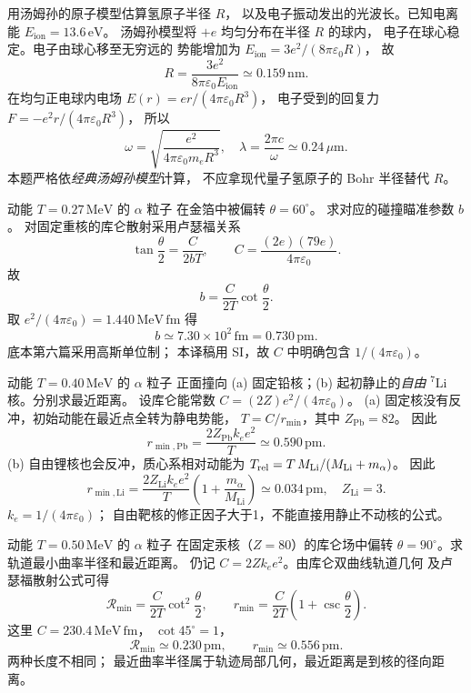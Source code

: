 用汤姆孙的原子模型估算氢原子半径 $R$，
以及电子振动发出的光波长。已知电离能
$E_{\mathrm{ion}}=13.6\,\mathrm{eV}$。
\exsolution
汤姆孙模型将 $+e$ 均匀分布在半径 $R$ 的球内，
电子在球心稳定。电子由球心移至无穷远的
势能增加为
$E_{\mathrm{ion}}=3e^2/(8\pi\varepsilon_0R)$，
故
\[
 \boxed{R=\frac{3e^2}{8\pi\varepsilon_0E_{\mathrm{ion}}}
 \simeq0.159\,\mathrm{nm}}.
\]
在均匀正电球内电场 $E(r)=er/(4\pi\varepsilon_0R^3)$，
电子受到的回复力 $F=-e^2r/(4\pi\varepsilon_0R^3)$，
所以
\[
 \omega=\sqrt{\frac{e^2}{4\pi\varepsilon_0m_eR^3}},
 \quad\boxed{\lambda=\frac{2\pi c}{\omega}
 \simeq0.24\,\mu\mathrm m}.
\]
\excheck 本题严格依\emph{经典汤姆孙模型}计算，
不应拿现代量子氢原子的 Bohr 半径替代 $R$。

动能 $T=0.27\,\mathrm{MeV}$ 的 $\alpha$ 粒子
在金箔中被偏转 $\theta=60^\circ$。
求对应的碰撞瞄准参数 $b$。
\exsolution
对固定重核的库仑散射采用卢瑟福关系
\[
 \tan\frac\theta2=
 \frac{C}{2bT},\qquad
 C=\frac{(2e)(79e)}{4\pi\varepsilon_0}.
\]
故
\[
 \boxed{b=\frac C{2T}\cot\frac\theta2}.
\]
取 $e^2/(4\pi\varepsilon_0)
=1.440\,\mathrm{MeV\,fm}$ 得
\[
 \boxed{b\simeq7.30\times10^2\,\mathrm{fm}
 =0.730\,\mathrm{pm}}.
\]
\excheck 底本第六篇采用高斯单位制；
本译稿用 SI，故 $C$ 中明确包含 $1/(4\pi\varepsilon_0)$。

动能 $T=0.40\,\mathrm{MeV}$ 的 $\alpha$ 粒子
正面撞向 (a) 固定铅核；(b) 起初静止的\emph{自由}
$^{7}\mathrm{Li}$ 核。分别求最近距离。
\exsolution
设库仑能常数
$C=(2Z)e^2/(4\pi\varepsilon_0)$。
(a) 固定核没有反冲，初始动能在最近点全转为静电势能，
$T=C/r_{\min}$，其中 $Z_{\mathrm{Pb}}=82$。
因此
\[
 \boxed{r_{\min,\mathrm{Pb}}=\frac{2Z_{\mathrm{Pb}}k_e e^2}{T}
 \simeq0.590\,\mathrm{pm}}.
\]
(b) 自由锂核也会反冲，质心系相对动能为
$T_{\rm rel}=T\,M_{\rm Li}/(M_{\rm Li}+m_\alpha)$。
因此
\[
 \boxed{r_{\min,\mathrm{Li}}=
 \frac{2Z_{\mathrm{Li}}k_e e^2}{T}
 \left(1+\frac{m_\alpha}{M_{\mathrm{Li}}}\right)
 \simeq0.034\,\mathrm{pm}},
 \quad Z_{\mathrm{Li}}=3.
\]
\excheck $k_e=1/(4\pi\varepsilon_0)$；
自由靶核的修正因子大于1，不能直接用静止不动核的公式。

动能 $T=0.50\,\mathrm{MeV}$ 的 $\alpha$ 粒子
在固定汞核（$Z=80$）的库仑场中偏转
$\theta=90^\circ$。求轨道最小曲率半径和最近距离。
\exsolution
仍记 $C=2Zk_e e^2$。由库仑双曲线轨道几何
及卢瑟福散射公式可得
\[
 \boxed{\mathcal R_{\min}=
 \frac C{2T}\cot^2\frac\theta2},\qquad
 \boxed{r_{\min}=
 \frac C{2T}\left(1+\csc\frac\theta2\right)}.
\]
这里 $C=230.4\,\mathrm{MeV\,fm}$，
$\cot45^\circ=1$，
\[
 \boxed{\mathcal R_{\min}\simeq0.230\,\mathrm{pm}},
 \qquad\boxed{r_{\min}\simeq0.556\,\mathrm{pm}}.
\]
\excheck 两种长度不相同；
最近曲率半径属于轨迹局部几何，最近距离是到核的径向距离。

